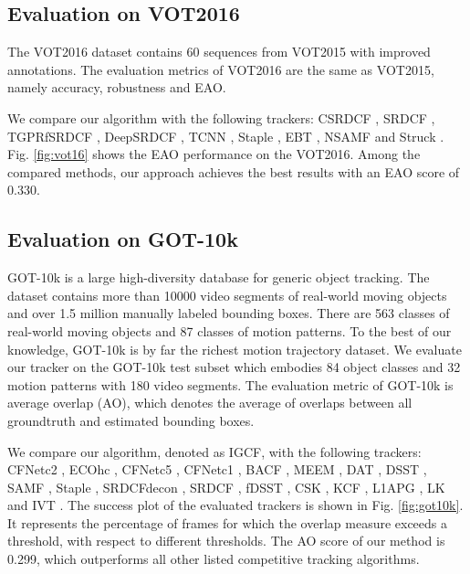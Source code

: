 \documentclass[review]{elsarticle}
\begin{document}
\begin{CJK*}{UTF8}{gbsn}
\subsection{Evaluation on VOT2016}
The VOT2016 \cite{Kristan2016TheVO} dataset contains 60 sequences from VOT2015 with improved annotations. The evaluation metrics of VOT2016 are the same as VOT2015, namely accuracy, robustness and EAO.

We compare our algorithm with the following trackers:
CSRDCF \cite{Lukezic2017DiscriminativeCF}, SRDCF \cite{Danelljan2015LearningSR}, TGPRfSRDCF \cite{gao2018tracking}, DeepSRDCF \cite{Danelljan2015ConvolutionalFF}, TCNN \cite{nam2016modeling}, Staple \cite{Bertinetto2016StapleC}, EBT \cite{Zhu2016BeyondLS}, NSAMF \cite{Hua2015OnlineOT} and Struck \cite{Hare2011StruckSO}. Fig. \ref{fig:vot16} shows the EAO performance on the VOT2016. Among the compared methods, our approach achieves the best results with an EAO score of 0.330.

\subsection{Evaluation on GOT-10k}
GOT-10k \cite{Huang2018GOT10kAL} is a large high-diversity database for generic object tracking. The dataset contains more than 10000 video segments of real-world moving objects and over 1.5 million manually labeled bounding boxes. There are 563 classes of real-world moving objects and 87 classes of motion patterns. 
To the best of our knowledge, GOT-10k is by far the richest motion trajectory dataset.
We evaluate our tracker on the GOT-10k test subset which embodies 84 object classes and 32 motion patterns with 180 video segments.
The evaluation metric of GOT-10k is average overlap (AO), which denotes the average of overlaps between all groundtruth and estimated bounding boxes. 

We compare our algorithm, denoted as IGCF, with the following trackers: CFNetc2 \cite{Valmadre2017EndtoEndRL}, ECOhc \cite{Danelljan2017ECOEC}, CFNetc5 \cite{Valmadre2017EndtoEndRL}, CFNetc1 \cite{Valmadre2017EndtoEndRL}, BACF \cite{Galoogahi2017LearningBC}, MEEM \cite{Zhang2014MEEMRT}, DAT \cite{Possegger2015InDO}, DSST \cite{Danelljan2014AccurateSE}, SAMF \cite{Li2014ASA}, Staple \cite{Bertinetto2016StapleC}, SRDCFdecon \cite{Danelljan2016AdaptiveDO}, SRDCF \cite{Danelljan2015LearningSR}, fDSST \cite{Danelljan2017DiscriminativeSS}, CSK \cite{Henriques2012ExploitingTC}, KCF \cite{Henriques2015HighSpeedTW}, L1APG \cite{Bao2012RealTR}, LK \cite{Shi1994GoodFT} and IVT \cite{Ross2007IncrementalLF}. The success plot of the evaluated trackers is shown in Fig. \ref{fig:got10k}. It represents the percentage of frames for which the overlap measure exceeds a threshold, with respect to different thresholds. The AO score of our method is 0.299, which outperforms all other listed competitive tracking algorithms.


\end{CJK*}
\end{document}

